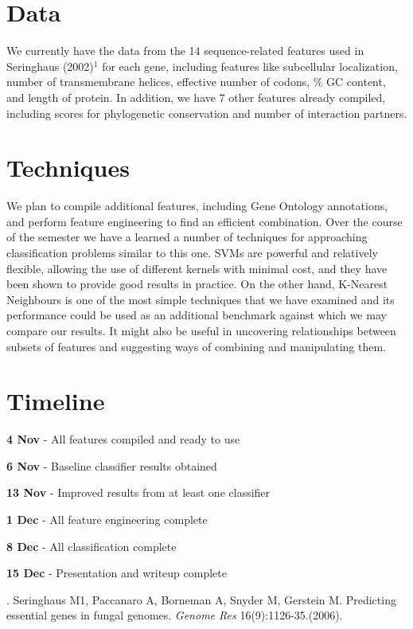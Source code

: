 \documentclass{article}
\begin{document}
\section{Data} \label{Data}

We currently have the data from the 14 sequence-related features used in Seringhaus (2002)$^1$ for each gene, including features like subcellular localization, number of transmembrane helices, effective number of codons, \% GC content, and length of protein. In addition, we have 7 other features already compiled, including scores for phylogenetic conservation and number of interaction partners. 


\section{Techniques}
We plan to compile additional features, including Gene Ontology annotations, and perform feature engineering to find an efficient combination. Over the course of the semester we have a learned a number of techniques for approaching classification problems similar to this one. SVMs are powerful and relatively flexible, allowing the use of different kernels with minimal cost, and they have been shown to provide good results in practice. On the other hand, K-Nearest Neighbours is one of the most simple techniques that we have examined and its performance could be used as an additional benchmark against which we may compare our results. It might also be useful in uncovering relationships between subsets of features and suggesting ways of combining and manipulating them.


\section{Timeline}
\begin{multicols}{2}

\noindent
\textbf{4 Nov} - All features compiled and ready to use

\noindent
\textbf{6 Nov} - Baseline classifier results obtained

\noindent
\textbf{13 Nov} - Improved results from at least one classifier

\noindent
\textbf{1 Dec} - All feature engineering complete

\noindent
\textbf{8 Dec} - All classification complete

\noindent
\textbf{15 Dec} - Presentation and writeup complete 

\end{multicols}

. Seringhaus M1, Paccanaro A, Borneman A, Snyder M, Gerstein M. Predicting essential genes in fungal genomes. \textit{Genome Res} 16(9):1126-35.(2006).
\end{document}
